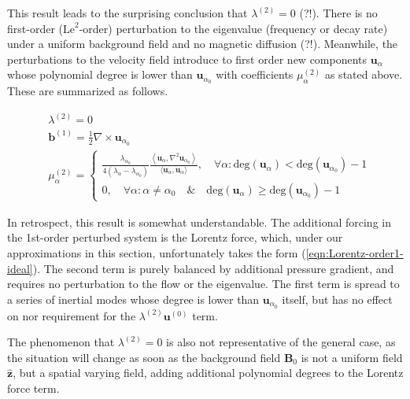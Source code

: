 %
This result leads to the surprising conclusion that $\lambda^{(2)} = 0$ (?!). There is no first-order ($\mathrm{Le}^2$-order) perturbation to the eigenvalue (frequency or decay rate) under a uniform background field and no magnetic diffusion (?!). 
Meanwhile, the perturbations to the velocity field introduce to first order new components $\mathbf{u}_\alpha$ whose polynomial degree is lower than $\mathbf{u}_{\alpha_0}$ with coefficients $\mu_\alpha^{(2)}$ as stated above. These are summarized as follows.
%
\begin{mdframed}[style=HighlightBox, frametitle={First-order perturbations under uniform background field, neglect magnetic diffusion}]
    \begin{align*}
        &\lambda^{(2)} = 0
        \\
        &\mathbf{b}^{(1)} = \frac{1}{2} \nabla\times \mathbf{u}_{\alpha_0} 
        \\
        &\mu_\alpha^{(2)} = \left\{\begin{aligned}
            \frac{\lambda_{\alpha_0}}{4(\lambda_\alpha - \lambda_{\alpha_0})} \frac{\left\langle \mathbf{u}_{\alpha}, \nabla^2 \mathbf{u}_{\alpha_0} \right\rangle}{\langle \mathbf{u}_{\alpha}, \mathbf{u}_{\alpha} \rangle},\quad \forall \alpha: \mathrm{deg}(\mathbf{u}_\alpha) < \mathrm{deg}(\mathbf{u}_{\alpha_0}) - 1 \\ 
            0,\quad \forall \alpha: \alpha \neq \alpha_0 \quad \& \quad \mathrm{deg}(\mathbf{u}_\alpha) \geq \mathrm{deg}(\mathbf{u}_{\alpha_0}) - 1
        \end{aligned}\right.
    \end{align*}
\end{mdframed}

In retrospect, this result is somewhat understandable. The additional forcing in the 1st-order perturbed system is the Lorentz force, which, under our approximations in this section, unfortunately takes the form (\ref{eqn:Lorentz-order1-ideal}). The second term is purely balanced by additional pressure gradient, and requires no perturbation to the flow or the eigenvalue. The first term is spread to a series of inertial modes whose degree is lower than $\mathbf{u}_{\alpha_0}$ itself, but has no effect on nor requirement for the $\lambda^{(2)} \mathbf{u}^{(0)}$ term. 

The phenomenon that $\lambda^{(2)} = 0$ is also not representative of the general case, as the situation will change as soon as the background field $\mathbf{B}_0$ is not a uniform field $\hat{\mathbf{z}}$, but a spatial varying field, adding additional polynomial degrees to the Lorentz force term.

